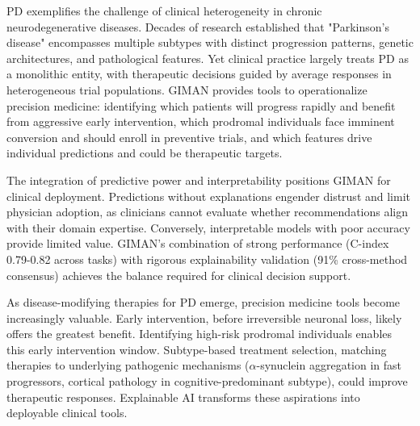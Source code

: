 PD exemplifies the challenge of clinical heterogeneity in chronic neurodegenerative diseases. Decades of research established that "Parkinson's disease" encompasses multiple subtypes with distinct progression patterns, genetic architectures, and pathological features. Yet clinical practice largely treats PD as a monolithic entity, with therapeutic decisions guided by average responses in heterogeneous trial populations. GIMAN provides tools to operationalize precision medicine: identifying which patients will progress rapidly and benefit from aggressive early intervention, which prodromal individuals face imminent conversion and should enroll in preventive trials, and which features drive individual predictions and could be therapeutic targets.

The integration of predictive power and interpretability positions GIMAN for clinical deployment. Predictions without explanations engender distrust and limit physician adoption, as clinicians cannot evaluate whether recommendations align with their domain expertise. Conversely, interpretable models with poor accuracy provide limited value. GIMAN's combination of strong performance (C-index 0.79-0.82 across tasks) with rigorous explainability validation (91\% cross-method consensus) achieves the balance required for clinical decision support.

As disease-modifying therapies for PD emerge, precision medicine tools become increasingly valuable. Early intervention, before irreversible neuronal loss, likely offers the greatest benefit. Identifying high-risk prodromal individuals enables this early intervention window. Subtype-based treatment selection, matching therapies to underlying pathogenic mechanisms ($\alpha$-synuclein aggregation in fast progressors, cortical pathology in cognitive-predominant subtype), could improve therapeutic responses. Explainable AI transforms these aspirations into deployable clinical tools.
